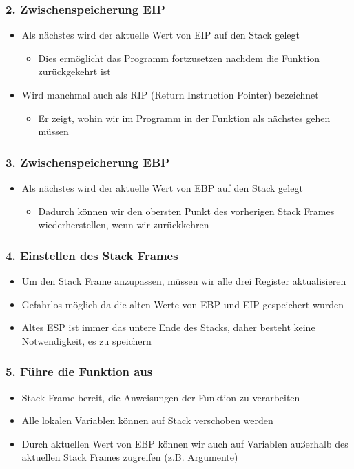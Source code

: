 \subsubsection*{2. Zwischenspeicherung EIP}
\begin{itemize}
    \item Als nächstes wird der aktuelle Wert von EIP auf den Stack gelegt
    \begin{itemize}
        \item Dies ermöglicht das Programm fortzusetzen nachdem die Funktion  zurückgekehrt ist
    \end{itemize}
    \item Wird manchmal auch als RIP (Return Instruction Pointer) bezeichnet
    \begin{itemize}
        \item Er zeigt, wohin wir im Programm in der Funktion  als nächstes gehen müssen
    \end{itemize}
\end{itemize}
\subsubsection*{3. Zwischenspeicherung EBP}
\begin{itemize}
    \item Als nächstes wird der aktuelle Wert von EBP auf den Stack gelegt
    \begin{itemize}
        \item Dadurch können wir den obersten Punkt des vorherigen Stack Frames wiederherstellen, wenn wir zurückkehren
    \end{itemize}
\end{itemize}
\subsubsection*{4. Einstellen des Stack Frames}
\begin{itemize}
    \item Um den Stack Frame anzupassen, müssen wir alle drei Register aktualisieren
    \item Gefahrlos möglich da die alten Werte von EBP und EIP gespeichert wurden
    \item Altes ESP ist immer das untere Ende des Stacks, daher besteht keine Notwendigkeit, es zu speichern
\end{itemize}
\subsubsection*{5. Führe die Funktion aus}
\begin{itemize}
    \item Stack Frame bereit, die Anweisungen der Funktion zu verarbeiten
    \item Alle lokalen Variablen können auf Stack verschoben werden
    \item Durch aktuellen Wert von EBP können wir auch auf Variablen außerhalb des aktuellen Stack Frames zugreifen (z.B. Argumente)
\end{itemize}
